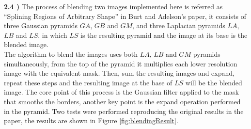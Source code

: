 \documentclass[12pt,a4paper]{article}
\begin{document}
\textbf{2.4 )} The process of blending two images implemented here is referred as ``Splining Regions of Arbitrary Shape'' in Burt and Adelson's paper, it consists of three Gaussian pyramids $GA$, $GB$ and $GM$, and three Laplacian pyramids $LA$, $LB$ and $LS$, in which $LS$ is the resulting pyramid and the image at its base is the blended image.  \\

The algorithm to blend the images uses both $LA$, $LB$ and $GM$ pyramids simultaneously, from the top of the pyramid it multiplies each lower resolution image with the equivalent mask. Then, sum the resulting images and expand, repeat these steps and the resulting image at the base of $LS$ will be the blended image. The core point of this process is the Gaussian filter applied to the mask that smooths the borders, another key point is the expand operation performed in the pyramid. Two tests were performed reproducing the original results in the paper, the results are shown in  Figure \ref{fig:blendingResult}. \\
\end{document}
